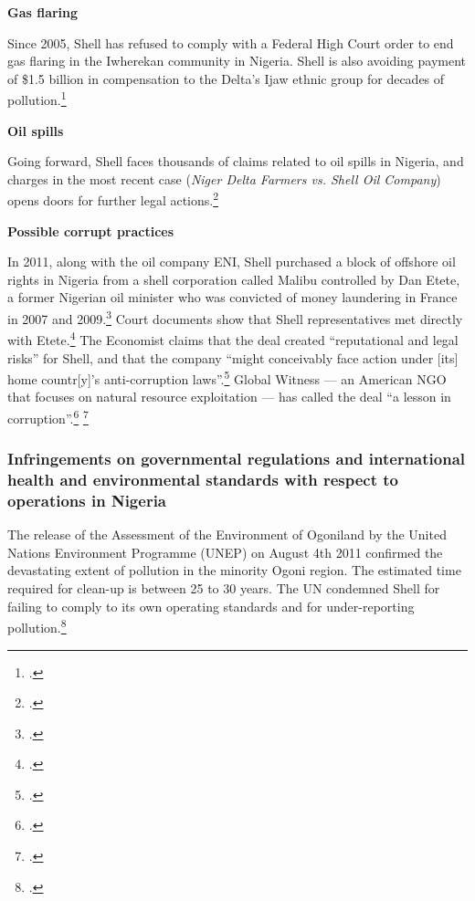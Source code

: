 \textbf{Gas flaring}



Since 2005, Shell has refused to comply with a Federal High Court order to end gas flaring in the Iwherekan community in Nigeria. 
Shell is also avoiding payment of \$1.5 billion in compensation to the Delta’s Ijaw ethnic group for decades of pollution.\footcite[][]{Ukala_2011}



\textbf{Oil spills}



Going forward, Shell faces thousands of claims related to oil spills in Nigeria, and charges in the most recent case (\emph{Niger Delta Farmers vs. Shell Oil Company}) opens doors for further legal actions.\footcite[][]{MixedVerdict}



\textbf{Possible corrupt practices}



In 2011, along with the oil company ENI, Shell purchased a block of offshore oil rights in Nigeria from a shell corporation called Malibu controlled by Dan Etete, a former Nigerian oil minister who was convicted of money laundering in France in 2007 and 2009.\footcite[][]{SafeSexNigeria}
Court documents show that Shell representatives met directly with Etete.\footcite[][]{GWShellKnew}
The Economist claims that the deal created ``reputational and legal risks'' for Shell, and that the company ``might conceivably face action under [its] home countr[y]'s anti-corruption laws''.\footcite[][]{SafeSexNigeria}
Global Witness --- an American NGO that focuses on natural resource exploitation --- has called the deal ``a lesson in corruption''.\footcite[See: ][]{GWObscurePayments} \footcite[][]{GWComeClean}




	\subsubsection{Infringements on governmental regulations and international health and environmental standards with respect to operations in Nigeria}
	
	
	
The release of the Assessment of the Environment of Ogoniland by the United Nations Environment Programme (UNEP) on August 4th 2011 confirmed the devastating extent of pollution in the minority Ogoni region. 
The estimated time required for clean-up is between 25 to 30 years. 
The UN condemned Shell for failing to comply to its own operating standards and for under-reporting pollution.\footcite[][]{Ogoniland}



